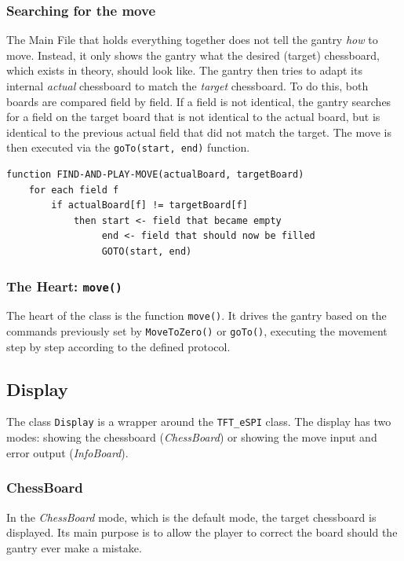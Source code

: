 \documentclass[10pt]{article}
\begin{document}
\subsubsection*{Searching for the move}
The Main File that holds everything together does not tell the gantry \emph{how} to
move. Instead, it only shows the gantry what the desired (target) chessboard, which
exists in theory, should look like. The gantry then tries to adapt its internal
\emph{actual} chessboard to match the \emph{target} chessboard. To do this, both boards
are compared field by field. If a field is not identical, the gantry searches for a
field on the target board that is not identical to the actual board, but is identical to
the previous actual field that did not match the target. The move is then executed via
the \texttt{goTo(start, end)} function.

\begin{lstlisting}
function FIND-AND-PLAY-MOVE(actualBoard, targetBoard)
    for each field f
        if actualBoard[f] != targetBoard[f]
            then start <- field that became empty
                 end <- field that should now be filled
                 GOTO(start, end)
\end{lstlisting}

\subsubsection*{The Heart: \texttt{move()}}
The heart of the class is the function \texttt{move()}. It drives the gantry based on
the commands previously set by \texttt{MoveToZero()} or \texttt{goTo()}, executing the
movement step by step according to the defined protocol.

\newpage

\subsection{Display}

The class \texttt{Display} is a wrapper around the \texttt{TFT\_eSPI} class. The display
has two modes: showing the chessboard (\emph{ChessBoard}) or showing the move input and
error output (\emph{InfoBoard}).

\subsubsection*{ChessBoard}
In the \emph{ChessBoard} mode, which is the default mode, the target chessboard is
displayed. Its main purpose is to allow the player to correct the board should the
gantry ever make a mistake.
\end{document}
